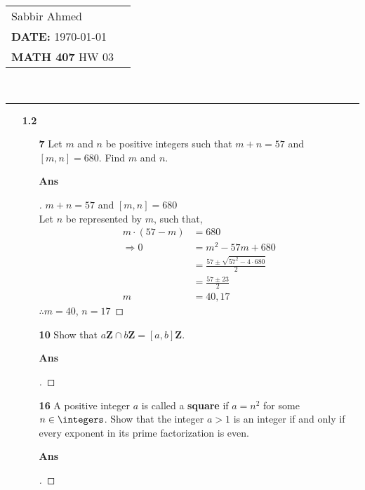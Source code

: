 \documentclass[paper=usletter, fontsize=12pt]{article}
\newcommand{\documentinfo}[5]{
    \begin{centering}
        \parbox{2in}{
        \begin{spacing}{1}
            \begin{flushleft}
                \begin{tabular}{l l}
                    #1 \\
                    #2 \\
                    #3 \\
                \end{tabular}\\
                \rule{\textwidth}{1pt}
            \end{flushleft}
        \end{spacing}
        }
    \end{centering}
}
\begin{document}
    \documentinfo{Sabbir Ahmed}{\textbf{DATE:} \today}{\textbf{MATH 407} HW 03}
    \vspace{-0.2in}

    \begin{itemize}

        \item[\textbf{1.2}]

        \begin{itemize}

            \item[\textbf{7}] Let $m$ and $n$ be positive integers such that $m
            + n = 57$ and $[m, n] = 680$. Find $m$ and $n$.
            \item[\textbf{Ans}]
            \begin{proof}[\unskip\nopunct]
                $m + n = 57$ and $[m, n] = 680$\\
                Let $n$ be represented by $m$, such that,
                \begingroup
                \addtolength{\jot}{1em}
                \begin{align*}
                    m \cdot (57 - m) & = 680\\
                    \Rightarrow 0 & = m^2 - 57m + 680\\
                    & = \frac{57 \pm \sqrt{57^2-4\cdot 680}}{2}\\
                    & = \frac{57 \pm 23}{2}\\
                    m & = 40, 17
                \end{align*}
                \endgroup
                $\therefore m = 40$, $n = 17$ \qedhere
            \end{proof}
            \vspace{0.2in}

            \item[\textbf{10}] Show that $a\textbf{Z} \cap b\textbf{Z} = [a,
            b]\textbf{Z}$.
            \item[\textbf{Ans}]
            \begin{proof}[\unskip\nopunct]
            \end{proof}
            \vspace{0.2in}

            \item[\textbf{16}] A positive integer $a$ is called a
            \textbf{square} if $a = n^2$ for some $n \in \integers$. Show that
            the integer $a > 1$ is an integer if and only if every exponent in
            its prime factorization is even.
            \item[\textbf{Ans}]
            \begin{proof}[\unskip\nopunct]
            \end{proof}
            \vspace{0.2in}


\end{itemize}
\end{itemize}
\end{document}
